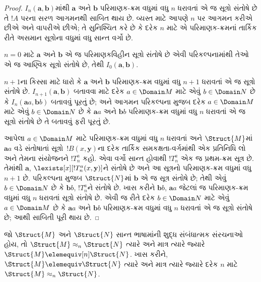 \begin{proof}
  $I_n(\mathbf{a},\mathbf{b})$માંથી $\mathbf{a}$ અને $\mathbf{b}$
  પરિમાણક-ક્રમ વધુમાં વધુ $n$ ધરાવતાં એ જ સૂત્રો સંતોષે છે તે
  $!A$ પરના સરળ આગમનથી સાબિત થાય છે. વ્યસ્ત માટે આપણે $n$ પર આગમન
  કરીએ છીએ અને  વાપરીએ છીએ; તે સુનિશ્ચિત કરે છે
  કે દરેક $n$ માટે એ પરિમાણક-ક્રમનાં તાર્કિક રીતે અસમાન સૂત્રોના વધુમાં
  વધુ સાન્ત વર્ગો છે.

  $n=0$ માટે $\mathbf{a}$ અને $\mathbf{b}$ એ જ પરિમાણકવિહીન
  સૂત્રો સંતોષે છે એવી પરિકલ્પનામાંથી તેઓ એ જ આણ્વિક સૂત્રો
  સંતોષે છે, તેથી $I_0(\mathbf{a},\mathbf{b})$.

  $n+1$ના કિસ્સા માટે ધારો કે $\mathbf{a}$ અને $\mathbf{b}$
  પરિમાણક-ક્રમ વધુમાં વધુ $n+1$ ધરાવતાં એ જ સૂત્રો સંતોષે છે.
  $I_{n+1}(\mathbf{a},\mathbf{b})$ બતાવવા માટે દરેક $a \in \Domain M$
  માટે એવું $b \in \Domain N$ છે કે $I_n(\mathbf{a}a,\mathbf{b}b)$
  બતાવવું પૂરતું છે; અને આગમન પરિકલ્પના મુજબ દરેક $a \in \Domain M$
  માટે એવું $b \in \Domain N$ છે કે $\mathbf{a}a$ અને $\mathbf{b}b$
  પરિમાણક-ક્રમ વધુમાં વધુ $n$ ધરાવતાં એ જ સૂત્રો સંતોષે છે તે
  બતાવવું ફરી પૂરતું છે.

  આપેલા $a \in \Domain M$ માટે પરિમાણક-ક્રમ વધુમાં વધુ $n$ ધરાવતાં
  અને $\Struct{M}$માં $\mathbf{a}a$ વડે સંતોષાતાં
  સૂત્રો~$!B(x,\mathbf{y})$ના દરેક તાર્કિક સમકક્ષતા-વર્ગમાંથી એક
  પ્રતિનિધિ લો અને તેમના સંયોજનને $!T^a_n$ કહો. એવા વર્ગો સાન્ત હોવાથી
  $!T^a_n$ એક જ પ્રથમ-ક્રમ સૂત્ર છે. તેમાંથી $\mathbf{a}$,
  $\lexists[x][!T^a_n(x,\mathbf{y})]$ને સંતોષે છે અને આ સૂત્રનો
  પરિમાણક-ક્રમ વધુમાં વધુ $n+1$ છે. પરિકલ્પના મુજબ $\Struct{N}$માં
  $\mathbf{b}$ એ જ સૂત્ર સંતોષે છે; તેથી એવું $b \in \Domain N$
  છે કે $\mathbf{b}b$, $!T^a_n$ને સંતોષે છે. ખાસ કરીને
  $\mathbf{b}b$, $\mathbf{a}a$ જેટલાં જ પરિમાણક-ક્રમ વધુમાં વધુ $n$
  ધરાવતાં સૂત્રો સંતોષે છે. એવી જ રીતે દરેક $b \in \Domain N$
  માટે એવું $a\in \Domain M$ છે કે $\mathbf{a}a$ અને $\mathbf{b}b$
  પરિમાણક-ક્રમ વધુમાં વધુ $n$ ધરાવતાં એ જ સૂત્રો સંતોષે છે; આથી
  સાબિતી પૂરી થાય છે.
\end{proof}

\begin{cor}
  જો $\Struct{M}$ અને $\Struct{N}$ સાન્ત ભાષામાંની શુદ્ધ
  સંબંધાત્મક સંરચનાઓ હોય, તો $\Struct{M} \approx_n\Struct{N}$
  ત્યારે અને માત્ર ત્યારે જ્યારે $\Struct{M} \elemequiv[n]
  \Struct{N}$. ખાસ કરીને, $\Struct{M} \elemequiv \Struct{N}$ ત્યારે
  અને માત્ર ત્યારે જ્યારે દરેક $n$ માટે $\Struct{M} \approx_n
  \Struct{N}$.
\end{cor}
\endgroup



